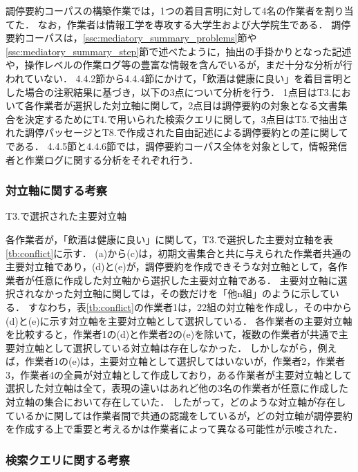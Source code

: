 \documentclass[japanese]{jnlp_1.4}
\begin{document}
調停要約コーパスの構築作業では，1つの着目言明に対して4名の作業者を割り当てた．
なお，作業者は情報工学を専攻する大学生および大学院生である．
調停要約コーパスは，\ref{ssc:mediatory_summary_problems}節や\ref{ssc:mediatory_summary_step}節で述べたように，抽出の手掛かりとなった記述や，操作レベルの作業ログ等の豊富な情報を含んでいるが，まだ十分な分析が行われていない．
{4.4.2}節から4.4.4節にかけて，「飲酒は健康に良い」を着目言明とした場合の注釈結果に基づき，以下の{3}点について分析を行う．
1点目はT3.において各作業者が選択した対立軸に関して，2点目は調停要約の対象となる文書集合を決定するためにT4.で用いられた検索クエリに関して，3点目はT5.で抽出された調停パッセージとT8.で作成された自由記述による調停要約との差に関してである．
4.4.5節と4.4.6節では，調停要約コーパス全体を対象として，情報発信者と作業ログに関する分析をそれぞれ行う．


\subsubsection{対立軸に関する考察}

\begin{table}[t]
 \caption{T3.で選択された主要対立軸}
 \label{tb:conflict}

\end{table}

各作業者が，「飲酒は健康に良い」に関して，T3.で選択した{主要}対立軸を表\ref{tb:conflict}に示す．
(a)から(c)は，初期文書集合と共に与えられた作業者共通の{主要}対立軸であり，(d)と(e)が，調停要約を作成できそうな対立軸として，各作業者が任意に作成した対立軸から選択した{主要対立}軸である．
主要対立軸に選択されなかった対立軸に関しては，その数だけを「他n組」のように示している．
すなわち，表\ref{tb:conflict}の作業者1は，22組の対立軸を作成し，その中から(d)と(e)に示す対立軸を主要対立軸として選択している．
各作業者の主要対立軸を比較すると，作業者1の(d)と作業者2の(e)を除いて，複数の作業者が共通で主要対立軸として選択している対立軸は存在しなかった．
しかしながら，例えば，作業者1の(e)は，主要対立軸として選択してはいないが，作業者2，作業者3，作業者4の全員が対立軸として作成しており，ある作業者が主要対立軸として選択した対立軸は全て，表現の違いはあれど他の3名の作業者が任意に作成した対立軸の集合において存在していた．
{したがって}，どのような対立軸が存在しているかに関しては作業者間で共通の認識をしているが，どの対立軸が調停要約を作成する上で重要と考えるかは作業者によって異なる可能性が示唆された．


\subsubsection{検索クエリに関する考察}
\end{document}

